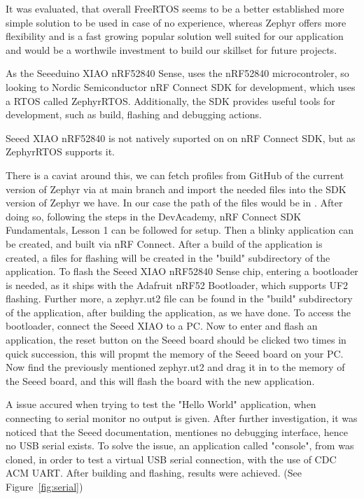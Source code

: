 \documentclass[titlepage,a4paper,11pt]{article}
\begin{document}
It was evaluated, that overall FreeRTOS seems to be a better established more simple solution to be used in case of no experience, whereas Zephyr offers more flexibility and is a fast growing popular solution well suited for our application and would be a worthwile investment to build our skillset for future projects. \cite{Industry}

As the Seeeduino XIAO nRF52840 Sense, uses the nRF52840 microcontroler, so looking to Nordic Semiconductor nRF Connect SDK for development, which uses a RTOS called ZephyrRTOS.
Additionally, the SDK provides useful tools for development, such as build, flashing and debugging actions. \cite{nRF}


Seeed XIAO nRF52840 is not natively suported on on nRF Connect SDK, but as ZephyrRTOS supports it. \cite{docsZephyr}

There is a caviat around this, we can fetch profiles from GitHub of the current version of Zephyr via  at main branch \cite{gitZephyr} and import the needed files into the SDK version of Zephyr we have.
In our case the path of the files would be in  .
After doing so, following the steps in the DevAcademy, nRF Connect SDK Fundamentals, Lesson 1 can be followed for setup. Then a blinky application can be created, and built via nRF Connect.
After a build of the application is created, a files for flashing will be created in the "build" subdirectory of the application.
To flash the Seeed XIAO nRF52840 Sense chip, entering a bootloader is needed, as it ships with the Adafruit nRF52 Bootloader, which supports UF2 flashing. \cite{docsZephyr}
Further more, a zephyr.ut2 file can be found in the "build" subdirectory of the application, after building the application, as we have done.
To access the bootloader, connect the Seeed XIAO to a PC.
Now to enter and flash an application, the reset button on the Seeed board should be clicked two times in quick succession, this will propmt the memory of the Seeed board on your PC.
Now find the previously mentioned zephyr.ut2 and drag it in to the memory of the Seeed board, and this will flash the board with the new application.

A issue accured when trying to test the "Hello World" application, when connecting to serial monitor no output is given.
After further investigation, it was noticed that the Seeed documentation, mentiones no debugging interface, hence no USB serial exists.
To solve the issue, an application called "console", from  was cloned, in order to test a virtual USB serial connection, with the use of CDC ACM UART. \cite{gitZephyr}
After building and flashing, results were achieved. (See Figure~\ref{fig:serial})
\end{document}
